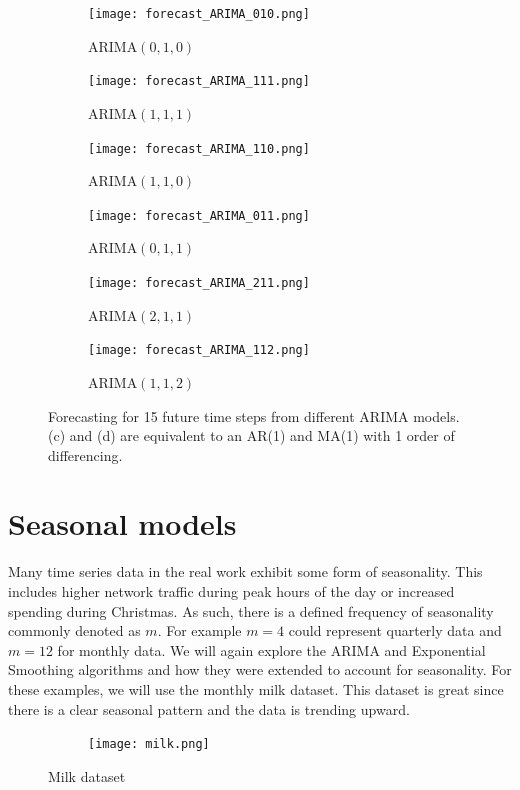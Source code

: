 \documentclass{article}
\begin{document}
  \begin{figure}[H]
    \centering
    \captionsetup{justification=centering}
    \begin{subfigure}[b]{0.49\linewidth}
      \texttt{[image: forecast\_ARIMA\_010.png]}
      \caption{ARIMA$(0, 1, 0)$}
    \end{subfigure}
    \begin{subfigure}[b]{0.49\linewidth}
      \texttt{[image: forecast\_ARIMA\_111.png]}
      \caption{ARIMA$(1, 1, 1)$}
    \end{subfigure}
    \begin{subfigure}[b]{0.49\linewidth}
      \texttt{[image: forecast\_ARIMA\_110.png]}
      \caption{ARIMA$(1, 1, 0)$}
    \end{subfigure}
    \begin{subfigure}[b]{0.49\linewidth}
      \texttt{[image: forecast\_ARIMA\_011.png]}
      \caption{ARIMA$(0, 1, 1)$}
    \end{subfigure}
    \begin{subfigure}[b]{0.49\linewidth}
      \texttt{[image: forecast\_ARIMA\_211.png]}
      \caption{ARIMA$(2, 1, 1)$}
    \end{subfigure}
    \begin{subfigure}[b]{0.49\linewidth}
      \texttt{[image: forecast\_ARIMA\_112.png]}
      \caption{ARIMA$(1, 1, 2)$}
    \end{subfigure}
    \caption{Forecasting for 15 future time steps from different ARIMA models. (c) and (d) are equivalent to an AR(1) and MA(1) with 1 order of differencing.}
  \end{figure}
  
  \newpage

  \section{Seasonal models}
  Many time series data in the real work exhibit some form of seasonality. This includes higher network traffic during peak hours of the day or increased spending during Christmas. As such, there is a defined frequency of seasonality commonly denoted as $m$. For example $m=4$ could represent quarterly data and $m=12$ for monthly data. We will again explore the ARIMA and Exponential Smoothing algorithms and how they were extended to account for seasonality. For these examples, we will use the monthly milk dataset. This dataset is great since there is a clear seasonal pattern and the data is trending upward.
  \begin{figure}[H]
    \centering
    \captionsetup{justification=centering}
    \begin{subfigure}[b]{\linewidth}
      \texttt{[image: milk.png]}
    \end{subfigure}
    \caption{Milk dataset}
  \end{figure}
\end{document}
